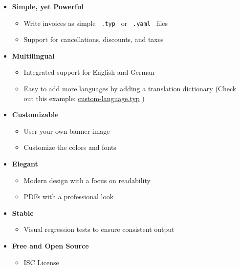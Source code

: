\begin{itemize}
\tightlist
\item
  \textbf{Simple, yet Powerful}

  \begin{itemize}
  \tightlist
  \item
    Write invoices as simple \texttt{\ .typ\ } or \texttt{\ .yaml\ }
    files
  \item
    Support for cancellations, discounts, and taxes
  \end{itemize}
\item
  \textbf{Multilingual}

  \begin{itemize}
  \tightlist
  \item
    Integrated support for English and German
  \item
    Easy to add more languages by adding a translation dictionary (Check
    out this example:
    \href{https://github.com/ad-si/invoice-maker/blob/master/examples/custom-language.typ}{custom-language.typ}
    )
  \end{itemize}
\item
  \textbf{Customizable}

  \begin{itemize}
  \tightlist
  \item
    User your own banner image
  \item
    Customize the colors and fonts
  \end{itemize}
\item
  \textbf{Elegant}

  \begin{itemize}
  \tightlist
  \item
    Modern design with a focus on readability
  \item
    PDFs with a professional look
  \end{itemize}
\item
  \textbf{Stable}

  \begin{itemize}
  \tightlist
  \item
    Visual regression tests to ensure consistent output
  \end{itemize}
\item
  \textbf{Free and Open Source}

  \begin{itemize}
  \tightlist
  \item
    ISC License
  \end{itemize}
\end{itemize}

